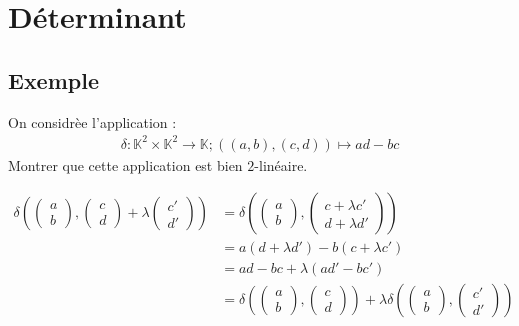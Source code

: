 \documentclass[../main.tex]{subfiles}
\begin{document}
\setcounter{chapter}{29}
\chapter{Déterminant}
\tableofcontents
\clearpage

\section{Exemple}
\begin{tcolorbox}[title=Exemple 30.4, title filled=false, colframe=darkgreen, colback=darkgreen!10!white]
    On considrèe l'application : 
    \begin{align*}
        \delta:\mathbb{K}^2 \times \mathbb{K}^2\to \mathbb{K}; ((a, b), (c, d)) \mapsto ad - bc
    \end{align*}
    Montrer que cette application est bien $2$-linéaire. 
\end{tcolorbox}

\begin{align*}
    \delta \left( \begin{pmatrix}
        a \\ b
    \end{pmatrix}, \begin{pmatrix}
        c \\ d
    \end{pmatrix} + \lambda \begin{pmatrix}
        c' \\ d'
    \end{pmatrix} \right) &= \delta \left( \begin{pmatrix}
        a \\ b
    \end{pmatrix}, \begin{pmatrix}
        c + \lambda c' \\ d + \lambda d'
    \end{pmatrix} \right) \\
    &= a(d + \lambda d') - b(c + \lambda c') \\
    &= ad - bc + \lambda(ad' - bc') \\
    &= \delta \left( \begin{pmatrix}
        a \\ b
    \end{pmatrix}, \begin{pmatrix}
        c \\ d
    \end{pmatrix} \right) + \lambda \delta \left( \begin{pmatrix}
        a \\ b
    \end{pmatrix}, \begin{pmatrix}
        c' \\ d'
    \end{pmatrix} \right)
\end{align*}
\end{document}
